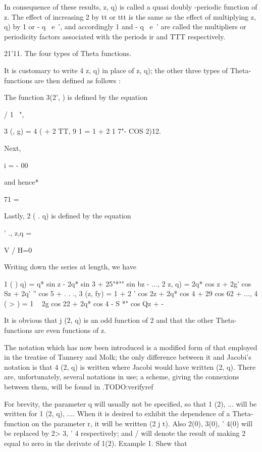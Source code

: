 In consequence of these results, z, q) is called a quasi doubly
-periodic function of z. The effect of increasing 2 by tt or ttt is
the same as the effect of multiplying z, q) by 1 or - q~ e~', and
accordingly 1 and - q~ e~' are called the multipliers or periodicity
factors associated with the periods ir and TTT respectively.

21'11. The four types of Theta functions.

It is customary to write 4 z, q) in place of z, q); the other three
types of Theta-functions are then defined as follows :

%
%

The function 3(2', ) is defined by the equation

/ 1 \ ",

 3 (, g) = 4 ( + 2 TT, 9 1 = 1 + 2 1 7"- COS 2)12.

Next, %

 i = - 00

and hence* %

71 =

Lastly, 2 ( . q) is defined by the equation

' ., z,q = %

V / H=0

Writing down the series at length, we have

 1 ( ) q) = q* sin z - 2q* sin 3 + 25"*"" sin bz - ..., 2 z, q) = 2q*
cos z + 2g' cos Sz + 2q' '' cos 5 + . . ., 3 (z, fy) = 1 + 2 ' cos 2z
+ 2q* cos 4 + 29 cos 62 + ..., 4 ( > ) = 1 ~ 2g cos 22 + 2q* cos 4 -
S *" cos Qz + -

It is obvious that j (2, q) is an odd function of 2 and that the other
Theta-functions are even functions of z.

The notation which has now been introduced is a modified form of that
employed in the treatise of Tannery and Molk; the only difference
between it and Jacobi's notation is that 4 (2, q) is written where
Jacobi would have written (2, q). There are, unfortunately, several
notations in use; a scheme, giving the connexions between them, will
be found in .TODO:verifyref

For brevity, the parameter q will usually not be specified, so that 1
(2), ... will be written for 1 (2, q), .... When it is desired to
exhibit the dependence of a Theta-function on the parameter r, it will
be written (2 j t). Also 2(0), 3(0), ' 4(0) will be replaced by 2> 3,
' 4 respectively; and / will denote the result of making 2 equal to
zero in the derivate of 1(2). Example 1. Shew that


